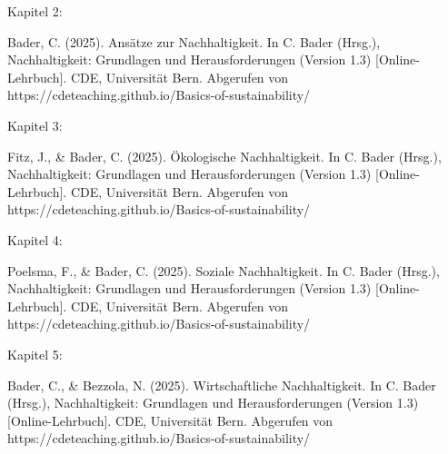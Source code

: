 \documentclass[
  nswissgerman,
  a4paper,
  DIV=11,
  numbers=noendperiod,
  oneside,
  openany]{scrreprt}
\begin{document}
Kapitel 2:

Bader, C. (2025). Ansätze zur Nachhaltigkeit. In C. Bader (Hrsg.),
Nachhaltigkeit: Grundlagen und Herausforderungen (Version 1.3)
{[}Online-Lehrbuch{]}. CDE, Universität Bern. Abgerufen von
https://cdeteaching.github.io/Basics-of-sustainability/

Kapitel 3:

Fitz, J., \& Bader, C. (2025). Ökologische Nachhaltigkeit. In C. Bader
(Hrsg.), Nachhaltigkeit: Grundlagen und Herausforderungen (Version 1.3)
{[}Online-Lehrbuch{]}. CDE, Universität Bern. Abgerufen von
https://cdeteaching.github.io/Basics-of-sustainability/

Kapitel 4:

Poelsma, F., \& Bader, C. (2025). Soziale Nachhaltigkeit. In C. Bader
(Hrsg.), Nachhaltigkeit: Grundlagen und Herausforderungen (Version 1.3)
{[}Online-Lehrbuch{]}. CDE, Universität Bern. Abgerufen von
https://cdeteaching.github.io/Basics-of-sustainability/

Kapitel 5:

Bader, C., \& Bezzola, N. (2025). Wirtschaftliche Nachhaltigkeit. In C.
Bader (Hrsg.), Nachhaltigkeit: Grundlagen und Herausforderungen (Version
1.3) {[}Online-Lehrbuch{]}. CDE, Universität Bern. Abgerufen von
https://cdeteaching.github.io/Basics-of-sustainability/
\end{document}
